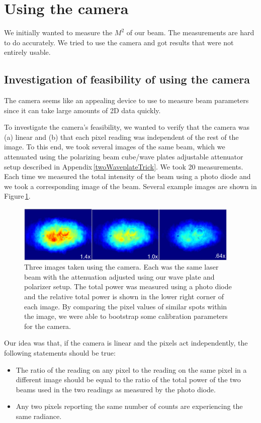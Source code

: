 \section{Using the camera}
We initially wanted to measure the $M^2$ of our beam. The measurements are hard to do accurately. We tried to use the camera and got results that were not entirely usable.

\subsection{Investigation of feasibility of using the camera}

The camera seems like an appealing device to use to measure beam parameters since it can take large amounts of 2D data quickly.


To investigate the camera's feasibility, we wanted to verify that the camera was (a) linear and (b) that each pixel reading was independent of the rest of the image. To this end, we took several images of the same beam, which we attenuated using the polarizing beam cube/wave plates adjustable attenuator setup described in Appendix\,\ref{twoWaveplateTrick}. We took 20 measurements. Each time we measured the total intensity of the beam using a photo diode and we took a corresponding image of the beam. Several example images are shown in Figure\,\ref{cameraimageexample}.

\begin{figure}
\centerline{
\includegraphics[width=0.95\textwidth]{cameraimage}
}
\caption[Sample camera images]{Three images taken using the camera. Each was the same laser beam with the attenuation adjusted using our wave plate and polarizer setup. The total power was measured using a photo diode and the relative total power is shown in the lower right corner of each image. By comparing the pixel values of similar spots within the image, we were able to bootstrap some calibration parameters for the camera. \label{cameraimageexample}}
\end{figure}

Our idea was that, if the camera is linear and the pixels act independently, the following statements should be true: 
\begin{itemize}
\item The ratio of the reading on any pixel to the reading on the same pixel in a different image should be equal to the ratio of the total power of the two beams used in the two readings as measured by the photo diode. 
\item Any two pixels reporting the same number of counts are experiencing the same radiance.
\end{itemize}

